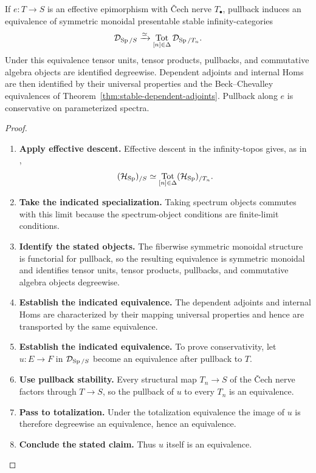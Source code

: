 \begin{proposition}
\label{thm:effective-descent-stable-coefficients-expanded}
If \(e:T\to S\) is an effective epimorphism with \v{C}ech nerve \(T_\bullet\),
pullback induces an equivalence of symmetric monoidal presentable stable
infinity-categories
\[
  \mathcal D_{\operatorname{Sp}/S}
  \xrightarrow{\simeq}
  \operatorname*{Tot}_{[n]\in\Delta}\mathcal D_{\operatorname{Sp}/T_n}.
\]
Under this equivalence tensor units, tensor products, pullbacks, and commutative
algebra objects are identified degreewise. Dependent adjoints and internal Homs are
then identified by their universal properties and the Beck--Chevalley equivalences
of Theorem~\ref{thm:stable-dependent-adjoints}. Pullback along \(e\) is
conservative on parameterized spectra.
\end{proposition}

\begin{proof}
\leavevmode
\begin{enumerate}[label=\textup{(\arabic*)}]
    \item \textbf{Apply effective descent.}
    Effective descent in the infinity-topos gives, as in \cite{LurieHigherToposTheory},
    \[
    (\mathcal H_{\operatorname{Sp}})_{/S}
    \simeq
    \operatorname*{Tot}_{[n]\in\Delta}
    (\mathcal H_{\operatorname{Sp}})_{/T_n}.
    \]
    \item \textbf{Take the indicated specialization.}
    Taking spectrum objects commutes with this limit because the spectrum-object
    conditions are finite-limit conditions.
    \item \textbf{Identify the stated objects.}
    The fiberwise symmetric monoidal structure
    is functorial for pullback, so the resulting equivalence is symmetric monoidal and
    identifies tensor units, tensor products, pullbacks, and commutative algebra objects
    degreewise.
    \item \textbf{Establish the indicated equivalence.}
    The dependent adjoints and internal Homs are characterized by their
    mapping universal properties and hence are transported by the same equivalence.
    \item \textbf{Establish the indicated equivalence.}
    To prove conservativity, let \(u:E\to F\) in \(\mathcal D_{\operatorname{Sp}/S}\) become an
    equivalence after pullback to \(T\).
    \item \textbf{Use pullback stability.}
    Every structural map
    \(T_n\to S\) of the \v{C}ech nerve factors through \(T\to S\), so the
    pullback of \(u\) to every \(T_n\) is an equivalence.
    \item \textbf{Pass to totalization.}
    Under the totalization
    equivalence the image of \(u\) is therefore degreewise an equivalence, hence an
    equivalence.
    \item \textbf{Conclude the stated claim.}
    Thus \(u\) itself is an equivalence.
\end{enumerate}
\end{proof}


